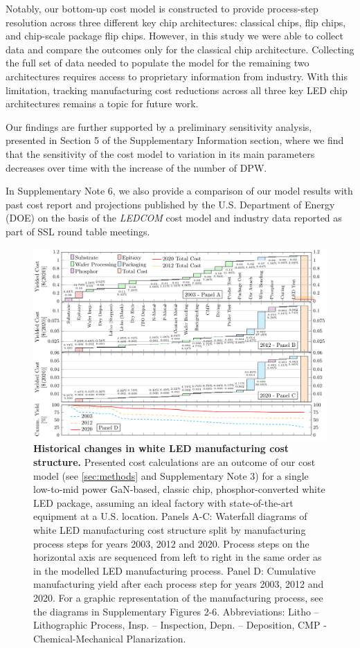 \documentclass[parskip=full]{article}
\begin{document}
Notably, our bottom-up cost model is constructed to provide process-step resolution across three different key chip architectures: classical chips, flip chips, and chip-scale package flip chips. However, in this study we were able to collect data and compare the outcomes only for the classical chip architecture. Collecting the full set of data needed to populate the model for the remaining two architectures requires access to proprietary information from industry. With this limitation, tracking manufacturing cost reductions across all three key LED chip architectures remains a topic for future work.

Our findings are further supported by a preliminary sensitivity analysis, presented in Section 5 of the Supplementary Information section, where we find that the sensitivity of the cost model to variation in its main parameters decreases over time with the increase of the number of DPW. 

In Supplementary Note 6, we also provide a comparison of our model results with past cost report and projections published by the U.S. Department of Energy (DOE) on the basis of the \textit{LEDCOM} cost model \cite{ledcomv2} and industry data reported as part of SSL round table meetings.

\begin{figure}[ht!]
\centering
\includegraphics[width=17.5cm]{figures/costmodel_results_years.pdf}
\caption{\textbf{Historical changes in white LED manufacturing cost structure.} Presented cost calculations are an outcome of our cost model (see \cref{sec:methods} and Supplementary Note 3) for a single low-to-mid power GaN-based, classic chip, phosphor-converted white LED package, assuming an ideal factory with state-of-the-art equipment at a U.S. location. Panels A-C: Waterfall diagrams of white LED manufacturing cost structure split by manufacturing process steps for years 2003, 2012 and 2020. Process steps on the horizontal axis are sequenced from left to right in the same order as in the modelled LED manufacturing process. Panel D: Cumulative manufacturing yield after each process step for years 2003, 2012 and 2020. For a graphic representation of the manufacturing process, see the diagrams in Supplementary Figures 2-6. Abbreviations: Litho – Lithographic Process, Insp. – Inspection, Depn. – Deposition, CMP - Chemical-Mechanical Planarization.}
\label{fgr:costmodel}
\end{figure}
\end{document}
